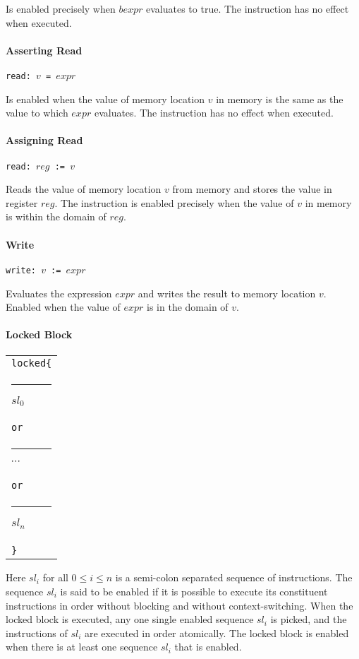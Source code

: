 \documentclass[a4paper]{article}
\begin{document}
Is enabled precisely when $bexpr$ evaluates to true. The instruction
has no effect when executed.

\paragraph{Asserting Read} \verb+read: +$v$\verb+ = +$expr$

Is enabled when the value of memory location $v$ in memory is the same
as the value to which $expr$ evaluates. The instruction has no effect
when executed.

\paragraph{Assigning Read} \verb+read: +$reg$\verb+ := +$v$

Reads the value of memory location $v$ from memory and stores the
value in register $reg$. The instruction is enabled precisely when the
value of $v$ in memory is within the domain of $reg$.

\paragraph{Write} \verb+write: +$v$\verb+ := +$expr$

Evaluates the expression $expr$ and writes the result to memory
location $v$. Enabled when the value of $expr$ is in the domain of
$v$.

\paragraph{Locked Block} \mbox{}

\noindent
\begin{tabular}{@{}l@{}}
  \verb+locked{+\\
  \rule{5pt}{0pt}$sl_0$\\
  \verb+or+\\
  \rule{5pt}{0pt}$\cdots$\\
  \verb+or+\\
  \rule{5pt}{0pt}$sl_n$\\
  \verb+}+\\
\end{tabular}

Here $sl_i$ for all $0 \leq i \leq n$ is a semi-colon separated
sequence of instructions. The sequence $sl_i$ is said to be enabled if
it is possible to execute its constituent instructions in order
without blocking and without context-switching. When the locked block
is executed, any one single enabled sequence $sl_i$ is picked, and the
instructions of $sl_i$ are executed in order atomically. The locked
block is enabled when there is at least one sequence $sl_i$ that is
enabled.
\end{document}

